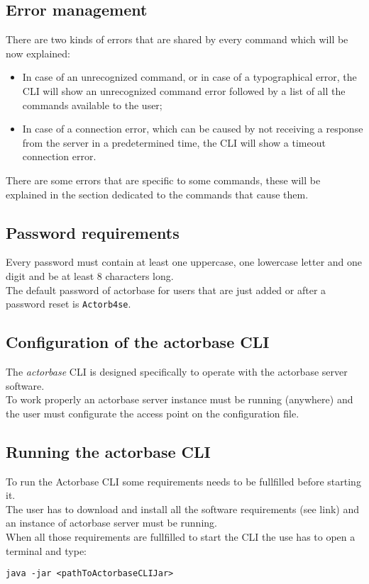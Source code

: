 \documentclass{scalatekids-article}
\begin{document}
\subsection{Error management}

There are two kinds of errors that are shared by every command which will be
now explained:
\begin{itemize}
\item In case of an unrecognized command, or in case of a typographical error,
  the CLI will show an unrecognized command error followed by a list of all
  the commands available to the user;
\item In case of a connection error, which can be caused by not receiving a
  response from the server in a predetermined time, the CLI will show a
  timeout connection error.
\end{itemize}
There are some errors that are specific to some commands, these will be explained
in the section dedicated to the commands that cause them.


\subsection{Password requirements}
\label{sec:passwordrequirement}
Every password must contain at least one uppercase, one lowercase letter and one
digit and be at least 8 characters long.\\
The default password of actorbase for users that are just added or after a password reset is \texttt{Actorb4se}.

\subsection{Configuration of the actorbase CLI} %
\label{sec:configurationcli}
The \textit{actorbase} CLI is designed specifically to operate
with the actorbase server software.\\
To work properly an actorbase server instance must be running
(anywhere) and the user must configurate the access point on the configuration file.

\subsection{Running the actorbase CLI} %
To run the Actorbase CLI some requirements needs to be fullfilled before starting it.\\
The user has to download and install all the software requirements (see link) and an instance of 
actorbase server must be running.\\
When all those requirements are fullfilled to start the CLI the use has to open a terminal and type:\\
\begin{center}
  \texttt{java -jar <pathToActorbaseCLIJar>}
\end{center} 
\end{document}
